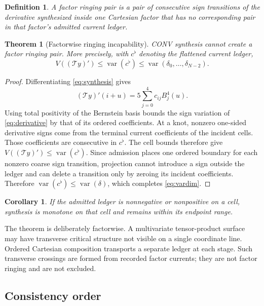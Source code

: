 \documentclass[journal]{IEEEtran}
\newtheorem{definition}{Definition}
\newtheorem{theorem}{Theorem}
\newtheorem{corollary}{Corollary}
\newcommand{\Tcal}{\mathcal{T}}
\newcommand{\var}{\operatorname{var}}
\begin{document}
\begin{definition}
A \emph{factor ringing pair} is a pair of consecutive sign transitions of
the derivative synthesized inside one Cartesian factor that has no
corresponding pair in that factor's admitted current ledger.
\end{definition}

\begin{theorem}[Factorwise ringing incapability]
CONV synthesis cannot create a factor ringing pair. More
precisely, with \(c^\flat\) denoting the flattened current ledger,
\begin{equation}
 V((\Tcal y)')\leq\var(c^\flat)\leq
 \var(\delta_0,\ldots,\delta_{N-2}).
\label{eq:vardim}
\end{equation}
\end{theorem}

\begin{proof}
Differentiating \eqref{eq:synthesis} gives
\begin{equation}
 (\Tcal y)'(i+u)=5\sum_{j=0}^{4}c_{ij}B_j^4(u).
 \label{eq:derivative}
\end{equation}
Using total positivity of the Bernstein basis bounds the sign variation of
\eqref{eq:derivative} by that of its ordered coefficients. At a knot,
nonzero one-sided derivative signs come from the terminal current
coefficients of the incident cells. Those coefficients are consecutive in
\(c^\flat\). The cell bounds therefore give
\(V((\Tcal y)')\leq\var(c^\flat)\). Since admission places one ordered
boundary for each nonzero coarse sign transition, projection cannot
introduce a sign outside the ledger and can delete a transition only by
zeroing its incident coefficients. Therefore
\(\var(c^\flat)\leq\var(\delta)\), which completes
\eqref{eq:vardim}.
\end{proof}

\begin{corollary}
If the admitted ledger is nonnegative or nonpositive on a cell, synthesis is
monotone on that cell and remains within its endpoint range.
\end{corollary}

The theorem is deliberately factorwise. A multivariate tensor-product
surface may have transverse critical structure not visible on a single
coordinate line. Ordered Cartesian composition transports a separate ledger
at each stage. Such transverse crossings are formed from recorded factor
currents; they are not factor ringing and are not excluded.

\subsection{Consistency order}
\end{document}

